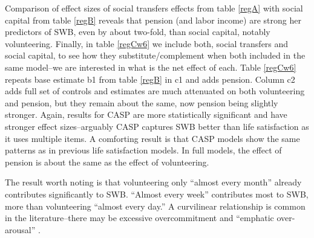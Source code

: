 \documentclass[10pt, letterpaper]{article}
\begin{document}
\begin{spacing}{1.4}
Comparison of effect sizes of social transfers effects from table \ref{regA} with  
 social capital from table \ref{regB} reveals that pension (and labor income) are
 strong her  predictors of SWB, even by about two-fold,  than social capital, notably volunteering.
%
Finally, in table \ref{regCw6} we include both, social transfers and social
capital,  to see how they substitute/complement
when both included in the same model--we are interested in what is the net
effect of each.
%
Table \ref{regCw6} repeats base estimate b1 from table \ref{regB} in c1 and
adds pension. %
% 
Column c2 adds full set of controls and estimates are much attenuated
on both volunteering and pension, but they remain about the same, now pension
being slightly stronger.
%
Again, results for CASP are more statistically
significant and have stronger effect sizes--arguably CASP captures SWB better
than life satisfaction as it uses multiple items. A comforting result is
that CASP models show the same patterns as in previous life satisfaction
models. In full models, the effect of pension is about the same as the effect of volunteering.


The result worth noting is that volunteering only ``almost every month'' already
contributes significantly to SWB. ``Almost every week'' contributes most
to SWB, more than volunteering ``almost every day.'' A curvilinear
relationship is common in the literature--there may be excessive overcommitment
and ``emphatic over-arousal''  \citep{wilson12B}.%



\end{spacing}
\end{document}
